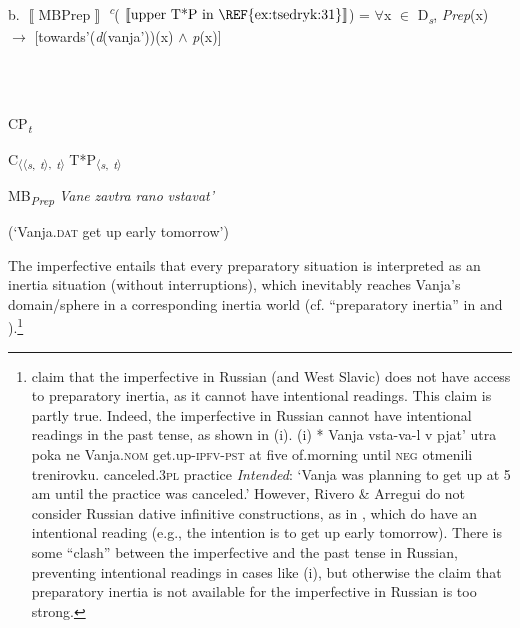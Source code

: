 \documentclass[output=paper,colorlinks,citecolor=brown]{./langscibook}
\begin{document}
  b.   $\left\llbracket \text{MB}\text{Prep}\right\rrbracket $ \textit{\textsuperscript{c}}( $\left\llbracket \text{upper T*P in \REF{ex:tsedryk:31}}\right\rrbracket $) = ${\forall}$x ${\in}$ D\textit{\textsubscript{s}}, \textit{Prep}(x) ${\rightarrow}$ [towards'(\textit{d}(vanja'))(x) ${\wedge}$ \textit{p}(x)] 

\ea%
    \label{ex:tsedryk:36}
    \gll\\
        \\
    \glt
    \z

            CP\textit{\textsubscript{t}}

  C\textsubscript{${\langle}{\langle}$}\textit{\textsubscript{s}}\textsubscript{,} \textit{\textsubscript{t}}\textsubscript{${\rangle}$,} \textit{\textsubscript{t}}\textsubscript{${\rangle}$}  T*P\textsubscript{${\langle}$}\textit{\textsubscript{s}}\textsubscript{,} \textit{\textsubscript{t}}\textsubscript{${\rangle}$}

  MB\textit{\textsubscript{Prep}}  \textit{Vane} \textit{zavtra} \textit{rano} \textit{vstavat’} 

    (‘Vanja.\textsc{dat} get up early tomorrow’)

The imperfective entails that every preparatory situation is interpreted as an inertia situation (without interruptions), which inevitably reaches Vanja’s domain/sphere in a corresponding inertia world (cf. “preparatory inertia” in \citealt[324]{RiveroArregui2012} and \citealt[327]{ArreguiRiveroSalanova2014}).\footnote{\citet[325]{RiveroArregui2012} claim that the imperfective in Russian (and West Slavic) does not have access to preparatory inertia, as it cannot have intentional readings. This claim is partly true. Indeed, the imperfective in Russian cannot have intentional readings in the past tense, as shown in (i).   (i)  *  Vanja         vsta-va-l           v   pjat’   utra           poka   ne             Vanja.\textsc{nom}   get.up-\textsc{ipfv-pst}   at  five   of.morning   until     \textsc{neg}                   otmenili       trenirovku.        canceled.\textsc{3pl}   practice     \textit{Intended}: ‘Vanja was planning to get up at 5 am until the practice was   canceled.’    However, Rivero \& Arregui do not consider Russian dative infinitive constructions, as in , which do have an intentional reading (e.g., the intention is to get up early tomorrow). There is some “clash” between the imperfective and the past tense in Russian, preventing intentional readings in cases like (i), but otherwise the claim that preparatory inertia is not available for the imperfective in Russian is too strong.} 
\end{document}
